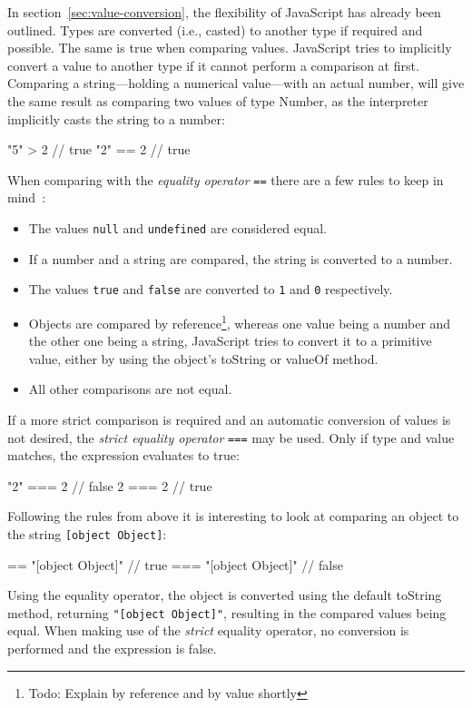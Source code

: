 In section~\ref{sec:value-conversion}, the flexibility of JavaScript has already been outlined. Types are converted (i.e., casted) to another type if required and possible.  The same is true when comparing values. JavaScript tries to implicitly convert a value to another type if it cannot perform a comparison at first. Comparing a string---holding a numerical value---with an actual number, will give the same result as comparing two values of type Number, as the interpreter implicitly casts the string to a number:
\begin{JsCode}[numbers=none]
"5" > 2 // true
"2" == 2 // true
\end{JsCode}
When comparing with the \emph{equality operator} \texttt{==} there are a few rules to keep in mind~\cite[~p.~72]{JavaScriptTheDefinitiveGuide:Flanagan:2011}:
\begin{itemize}
  \item The values \texttt{null} and \texttt{undefined} are considered equal.
  \item If a number and a string are compared, the string is converted to a number.
  \item The values \texttt{true} and \texttt{false} are converted to \texttt{1} and \texttt{0} respectively.
  \item Objects are compared by reference\footnote{Todo: Explain by reference and by value shortly}, whereas one value being a number and the other one being a string, JavaScript tries to convert it to a primitive value, either by using the object's toString or valueOf method.
  \item All other comparisons are not equal.
\end{itemize}
If a more strict comparison is required and an automatic conversion of values is not desired, the \emph{strict equality operator} \texttt{===} may be used. Only if type and value matches, the expression evaluates to true:
\begin{JsCode}[numbers=none]
"2" === 2 // false
2 === 2   // true
\end{JsCode}
Following the rules from above it is interesting to look at comparing an object to the string \texttt{[object Object]}:
\begin{JsCode}[numbers=none]
{} == "[object Object]"  // true
{} === "[object Object]" // false
\end{JsCode}
Using the equality operator, the object is converted using the default toString method, returning \texttt{"[object Object]"}, resulting in the compared values being equal. When making use of the \emph{strict} equality operator, no conversion is performed and the expression is false.

